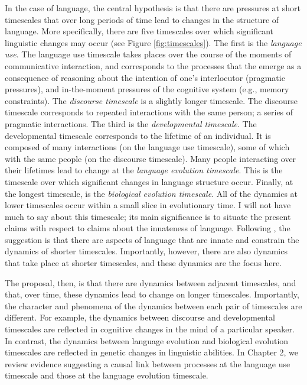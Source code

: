 In the case of language, the central  hypothesis is that there are pressures at  short timescales that over long periods of time lead to changes in the structure of language. More specifically,  there are five timescales over which significant linguistic changes may occur (see Figure \ref{fig:timescales}). The first is the {\it language use}. The language use timescale takes places over the course of the moments of communicative interaction, and corresponds to the processes  that the emerge as a consequence of reasoning about the intention of one's interlocutor (pragmatic pressures), and in-the-moment pressures of the cognitive system (e.g., memory constraints).  The {\it discourse timescale} is a slightly longer timescale. The discourse timescale corresponds to repeated interactions with the same person; a series of pragmatic interactions. The third is the {\it developmental timescale}. The developmental timescale corresponds to the lifetime of an individual. It is composed of many interactions (on the language use timescale), some of which with the same people (on the discourse timescale).  Many people interacting over their lifetimes lead to change at the {\it language evolution timescale}. This is the timescale over which significant changes in language structure  occur. Finally, at the longest timescale, is the {\it biological evolution timescale}. All of the dynamics at lower timescales occur within a small slice in evolutionary time. I will not have much to say about this timescale; its main significance is to situate the present claims with respect to claims about the innateness of language. Following , the suggestion is that there are aspects of language that are innate and constrain the dynamics of shorter timescales. Importantly, however, there are also  dynamics that take place at  shorter timescales, and these dynamics are the focus here.




The proposal, then, is that there are dynamics between adjacent timescales, and that, over time, these dynamics lead to change on longer timescales.  Importantly, the character and phenomena of the dynamics between each pair of timescales are different. For example,  the dynamics between discourse and developmental timescales are reflected in cognitive changes in the mind of a particular speaker. In contrast, the dynamics between language evolution and biological evolution timescales are reflected in genetic changes in linguistic abilities. In Chapter 2, we review evidence suggesting a causal link between processes at the language use timescale and those at the language evolution timescale.

